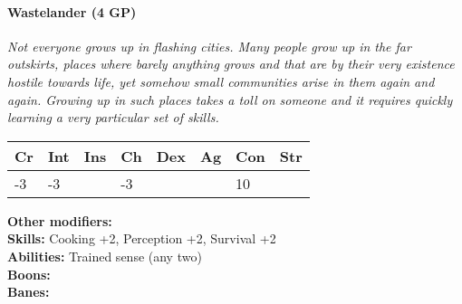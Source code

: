 \paragraph*{Wastelander (4 GP)}
\textit{Not everyone grows up in flashing cities. Many people grow up in the far outskirts, places where barely anything grows and that are by their very existence hostile towards life, yet somehow small communities arise in them again and again.
	Growing up in such places takes a toll on someone and it requires quickly learning a very particular set of skills.}\par
\begin{tabular}{|l|l|l|l|l|l|l|l|}
	\hline
	Cr & Int & Ins & Ch & Dex & Ag & Con & Str \\ \hline
	-3 & -3 &  & -3 &  &  & 10 &  \\ \hline
\end{tabular}\par
\noindent\textbf{Other modifiers:} \\
\textbf{Skills:} Cooking +2,
Perception +2,
Survival +2\\
\textbf{Abilities:} Trained sense (any two)\\
\textbf{Boons:} \\
\textbf{Banes:} \\

